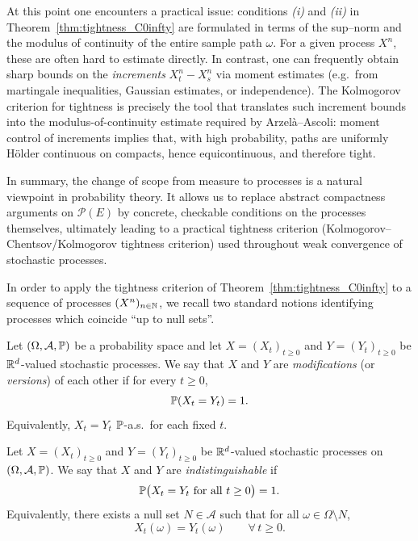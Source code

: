 At this point one encounters a practical issue: conditions \emph{(i)} and \emph{(ii)} in
Theorem~\ref{thm:tightness_C0infty} are formulated in terms of the sup--norm and the modulus of
continuity of the entire sample path $\omega$.  For a given process $X^n$, these are often hard to
estimate directly.  In contrast, one can frequently obtain sharp bounds on the \emph{increments}
$X^n_t-X^n_s$ via moment estimates (e.g.\ from martingale inequalities,
Gaussian estimates, or independence).  The Kolmogorov criterion for tightness is precisely the
tool that translates such increment bounds into the modulus-of-continuity estimate required by
Arzel\`a--Ascoli: moment control of increments implies that, with high probability, paths are
uniformly H\"older continuous on compacts, hence equicontinuous, and therefore tight.

In summary, the change of scope from measure to processes is a
natural viewpoint in probability theory.  It allows us to replace abstract compactness arguments
on $\mathcal{P}(E)$ by concrete, checkable conditions on the processes themselves, ultimately
leading to a practical tightness criterion (Kolmogorov--Chentsov/Kolmogorov tightness criterion)
used throughout weak convergence of stochastic processes.


In order to apply the tightness criterion of Theorem~\ref{thm:tightness_C0infty} to a sequence of
processes $(X^n)_{n\in\mathbb{N}}$, we recall two standard notions identifying processes which coincide ``up to null sets''.

\begin{definition}[Modification]\label{def:modification}
Let $(\Omega,\mathcal{A},\mathbb{P})$ be a probability space and let
$X=(X_t)_{t\ge 0}$ and $Y=(Y_t)_{t\ge 0}$ be $\mathbb{R}^d$-valued stochastic processes.
We say that $X$ and $Y$ are \emph{modifications} (or \emph{versions}) of each other if
for every $t\ge 0$,
\[
\mathbb{P}(X_t = Y_t)=1 .
\]
Equivalently, $X_t=Y_t$ $\mathbb{P}$-a.s.\ for each fixed $t$.
\end{definition}

\begin{definition}[Indistinguishability]\label{def:indistinguishable}
Let $X=(X_t)_{t\ge 0}$ and $Y=(Y_t)_{t\ge 0}$ be $\mathbb{R}^d$-valued stochastic processes on
$(\Omega,\mathcal{A},\mathbb{P})$.
We say that $X$ and $Y$ are \emph{indistinguishable} if
\[
\mathbb{P}\bigl( X_t = Y_t\ \text{for all }t\ge 0 \bigr)=1 .
\]
Equivalently, there exists a null set $N\in\mathcal{A}$ such that for all $\omega\in\Omega\setminus N$,
\[
X_t(\omega)=Y_t(\omega)\qquad\forall\,t\ge 0 .
\]
\end{definition}

